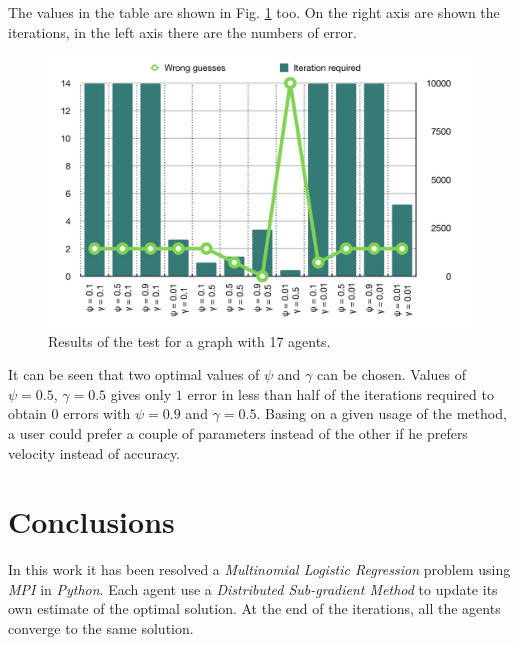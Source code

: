 \documentclass[a4paper,11pt,oneside]{book}
\begin{document}
The values in the table are shown in Fig. \ref{17_agents_performance} too. On the right axis are shown the iterations, in the left axis there are the numbers of error.

\begin{figure}[h]
	\centering
	\includegraphics[scale=0.24]{figs/graphs_17_agents_performance}
	\caption{Results of the test for a graph with 17 agents.}
	\label{17_agents_performance}
\end{figure}

It can be seen that two optimal values of $\psi$ and $\gamma$ can be chosen.
Values of $\psi=0.5$, $\gamma=0.5$ gives only $1$ error in less than half of the iterations required to obtain $0$ errors with $\psi=0.9$ and $\gamma=0.5$. Basing on a given usage of the method, a user could prefer a couple of parameters instead of the other if he prefers velocity instead of accuracy.


\chapter*{Conclusions} %
In this work it has been resolved a \textit{Multinomial Logistic Regression} problem using \textit{MPI} in \textit{Python}. Each agent use a \textit{Distributed Sub-gradient Method} to update its own estimate of the optimal solution. At the end of the iterations, all the agents converge to the same solution.


{}
   
\end{document}
